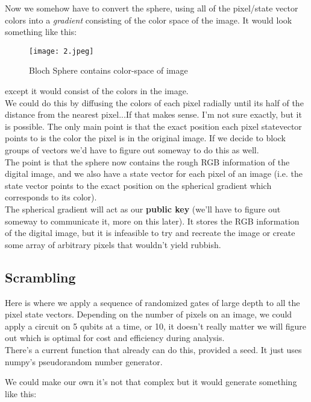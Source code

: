 \documentclass[svgnames]{article}     %
\begin{document}
Now we somehow have to convert the sphere, using all of the pixel/state vector
colors into a \textit{gradient} consisting of the color space of the image. It
would look something like this: 

\begin{figure}[H]
  \centering
    \texttt{[image: 2.jpeg]}
    \caption{Bloch Sphere contains color-space of image}
\end{figure}

except it would consist of the colors in the image. \\

We could do this by
diffusing the colors of each pixel radially until its half of the distance from
the nearest pixel...If that makes sense. I'm not sure exactly, but it is
possible. The only main point is that the exact position each pixel statevector
points to is the color the pixel is in the original image. If we decide to block groups of vectors we'd have to figure out someway to do
this as well. \\

The point is that the sphere now contains the rough RGB information of the
digital
image, and we also have a state vector for each pixel of an image
(i.e. the state vector points to the exact position on the spherical gradient which
corresponds to its color). \\

The spherical gradient will act as our \textbf{public key} (we'll have to
figure out someway to communicate it, more on this later). It stores the
RGB information of the digital image, but it is infeasible to try and recreate
the image or create some array of arbitrary pixels that wouldn't yield rubbish. 

\subsection{Scrambling}

Here is where we apply a sequence of randomized gates of large depth to all the
pixel state vectors. Depending on the number of pixels on an image, we could
apply a circuit on 5 qubits at a time, or 10, it doesn't really matter we will
figure out which is optimal for cost and efficiency during analysis. \\

There's a current function that already can do this, provided a seed. It just
uses numpy's pseudorandom number generator. 

We could make our own it's not that
complex but it would generate something like this:
\end{document}
